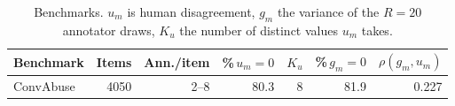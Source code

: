 \begin{table}[t]
\centering
\small
\begin{tabular}{lrrrrrr}
\hline
Benchmark & Items & Ann./item & \%\,$u_m{=}0$ & $K_u$ & \%\,$g_m{=}0$ & $\rho(g_m,u_m)$ \\
\hline
ConvAbuse & 4050 & 2--8 & 80.3 & 8 & 81.9 & 0.227 \\
\hline
\end{tabular}
\caption{Benchmarks. $u_m$ is human disagreement, $g_m$ the variance of the $R=20$ annotator draws, $K_u$ the number of distinct values $u_m$ takes.}
\label{tab:data}
\end{table}